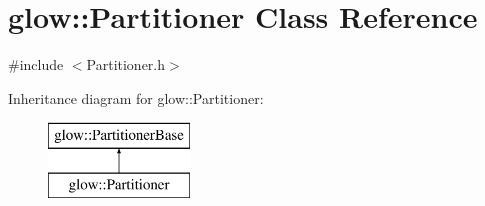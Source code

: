 \hypertarget{classglow_1_1_partitioner}{}\section{glow\+:\+:Partitioner Class Reference}
\label{classglow_1_1_partitioner}


{\ttfamily \#include $<$Partitioner.\+h$>$}

Inheritance diagram for glow\+:\+:Partitioner\+:\begin{figure}[H]
\begin{center}
\leavevmode
\includegraphics[height=2.000000cm]{classglow_1_1_partitioner}
\end{center}
\end{figure}
